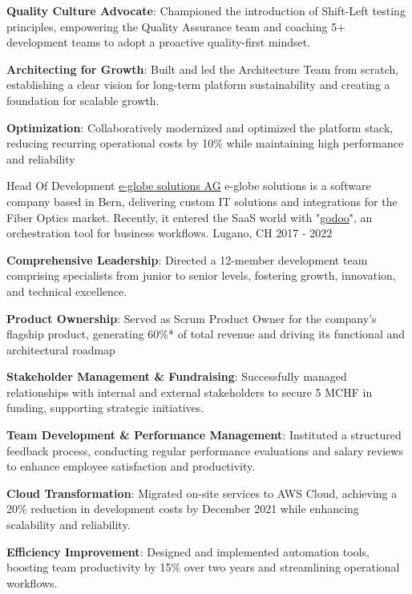 \begin{cventries}
{\begin{cvitems}
        \item {\textbf{Quality Culture Advocate}: Championed the introduction of Shift-Left testing principles, empowering the Quality Assurance team and coaching 5+ development teams to adopt a proactive quality-first mindset.}
        \item {\textbf{Architecting for Growth}: Built and led the Architecture Team from scratch, establishing a clear vision for long-term platform sustainability and creating a foundation for scalable growth.}
        \item {\textbf{Optimization}: Collaboratively modernized and optimized the platform stack, reducing recurring operational costs by 10\% while maintaining high performance and reliability}
      \end{cvitems}
    }

	\cventry
	{Head Of Development} %
	{\href{https://www.e-globe-solutions.com}{e-globe solutions AG}} %
  {e-globe solutions is a software company based in Bern, delivering custom IT solutions and integrations for the Fiber Optics market. Recently, it entered the SaaS world with "\href{https://www.godoo.ch}{godoo}", an orchestration tool for business workflows.} %
	{Lugano, CH} %
	{2017 - 2022} %
	{
		\begin{cvitems} %
			\item {\textbf{Comprehensive Leadership}: Directed a 12-member development team comprising specialists from junior to senior levels, fostering growth, innovation, and technical excellence.}
			\item {\textbf{Product Ownership}: Served as Scrum Product Owner for the company’s flagship product, generating 60\%* of total revenue and driving its functional and architectural roadmap}
			\item {\textbf{Stakeholder Management \& Fundraising}: Successfully managed relationships with internal and external stakeholders to secure 5 MCHF in funding, supporting strategic initiatives.}
			\item {\textbf{Team Development \& Performance Management}: Instituted a structured feedback process, conducting regular performance evaluations and salary reviews to enhance employee satisfaction and productivity.}
			\item {\textbf{Cloud Transformation}: Migrated on-site services to AWS Cloud, achieving a 20\% reduction in development costs by December 2021 while enhancing scalability and reliability.}
			\item {\textbf{Efficiency Improvement}: Designed and implemented automation tools, boosting team productivity by 15\% over two years and streamlining operational workflows.}
		\end{cvitems}
	}


\end{cventries}
